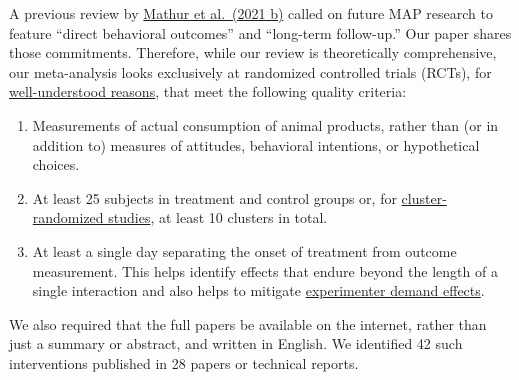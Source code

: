 \documentclass[
  letterpaper,
  DIV=11,
  numbers=noendperiod]{scrartcl}
\providecommand{\tightlist}{%
  \setlength{\itemsep}{0pt}\setlength{\parskip}{0pt}}\usepackage{longtable,booktabs,array}
\begin{document}
A previous review by
\href{https://www.sciencedirect.com/science/article/pii/S0195666321001847}{Mathur
et al.~(2021 b)} called on future MAP research to feature ``direct
behavioral outcomes'' and ``long-term follow-up.'' Our paper shares
those commitments. Therefore, while our review is theoretically
comprehensive, our meta-analysis looks exclusively at randomized
controlled trials (RCTs), for
\href{https://www.sfu.ca/~palys/Campbell\&Stanley-1959-Exptl\&QuasiExptlDesignsForResearch.pdf}{well-understood
reasons}, that meet the following quality criteria:

\begin{enumerate}
\def\labelenumi{\arabic{enumi}.}
\tightlist
\item
  Measurements of actual consumption of animal products, rather than (or
  in addition to) measures of attitudes, behavioral intentions, or
  hypothetical choices.
\item
  At least 25 subjects in treatment and control groups or, for
  \href{https://www.jstor.org/stable/25791925}{cluster-randomized
  studies}, at least 10 clusters in total.
\item
  At least a single day separating the onset of treatment from outcome
  measurement. This helps identify effects that endure beyond the length
  of a single interaction and also helps to mitigate
  \href{https://link.springer.com/article/10.1007/s10683-009-9230-z}{experimenter
  demand effects}.
\end{enumerate}

We also required that the full papers be available on the internet,
rather than just a summary or abstract, and written in English. We
identified 42 such interventions published in 28 papers or technical
reports.
\end{document}
